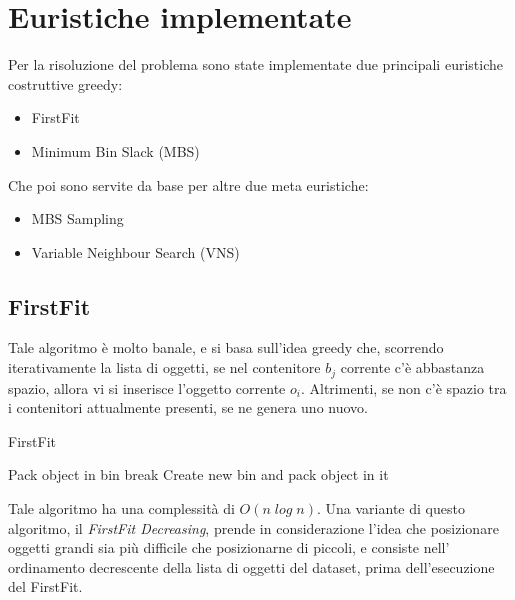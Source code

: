 \documentclass{article}
\begin{document}
\section{Euristiche implementate}
Per la risoluzione del problema sono state implementate due principali euristiche costruttive greedy:

\begin{itemize}
\item FirstFit
\item Minimum Bin Slack (MBS)
\end{itemize}

Che poi sono servite da base per altre due meta euristiche:

\begin{itemize}
\item MBS Sampling
\item Variable Neighbour Search (VNS)
\end{itemize} 
\newpage
\subsection{FirstFit}
Tale algoritmo è molto banale, e si basa sull'idea greedy che, scorrendo iterativamente la lista di oggetti, se nel contenitore $b_j$ corrente c'è abbastanza spazio, allora vi si inserisce l'oggetto corrente $o_i$. Altrimenti, se non c'è spazio tra i contenitori attualmente presenti, se ne genera uno nuovo.
\newline
\begin{algorithm}[h]
\caption{FirstFit}\label{FirstFit}
\begin{algorithmic}[1]
\State Pack object in bin
\State break
\EndIf
{}
\EndFor
{}
\State Create new bin and pack object in it
\EndIf 
{}
\EndFor
{}
\end{algorithmic}
\end{algorithm}
\newline
\newline
\newline
Tale algoritmo ha una complessità di  $O(n\;log\;n)$.
\newline
\newline
Una variante di questo algoritmo, il \textit{FirstFit Decreasing}, prende in considerazione l'idea che posizionare oggetti grandi sia più difficile che posizionarne di piccoli, e consiste nell' ordinamento decrescente della lista di oggetti del dataset, prima dell'esecuzione del FirstFit. 
\newline
\newline
\end{document}
